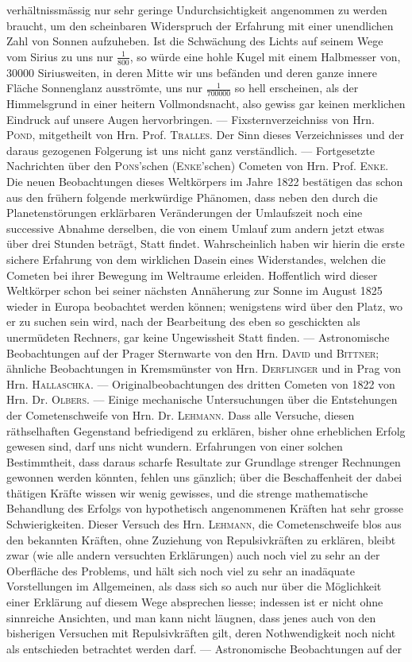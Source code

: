 \noindent verhältnissmässig nur sehr geringe Undurchsichtigkeit angenommen zu werden braucht, um den scheinbaren Widerspruch der Erfahrung mit einer unendlichen Zahl von Sonnen aufzuheben. Ist die Schwächung des Lichts auf seinem Wege vom Sirius zu uns nur $\frac{1}{800}$, so würde eine hohle Kugel mit einem Halbmesser von, 30000 Siriusweiten, in deren Mitte wir uns befänden und deren ganze innere Fläche Sonnenglanz ausströmte, uns nur $\frac{1}{700000}$ so hell erscheinen, als der Himmelsgrund in einer heitern Vollmondsnacht, also gewiss gar keinen merklichen Eindruck auf unsere Augen hervorbringen. --- Fixsternverzeichniss von Hrn. \textsc{Pond}, mitgetheilt von Hrn. Prof. \textsc{Tralles}. Der Sinn dieses Verzeichnisses und der daraus gezogenen Folgerung ist uns nicht ganz verständlich. --- Fortgesetzte Nachrichten über den \textsc{Pons}'schen (\textsc{Enke}'schen) Cometen von Hrn. Prof. \textsc{Enke}. Die neuen Beobachtungen dieses Weltkörpers im Jahre 1822 bestätigen das schon aus den frühern folgende merkwürdige Phänomen, dass neben den durch die Planetenstörungen erklärbaren Veränderungen der Umlaufszeit noch eine successive Abnahme derselben, die von einem Umlauf zum andern jetzt etwas über drei Stunden beträgt, Statt findet. Wahrscheinlich haben wir hierin die erste sichere Erfahrung von dem wirklichen Dasein eines Widerstandes, welchen die Cometen bei ihrer Bewegung im Weltraume erleiden. Hoffentlich wird dieser Weltkörper schon bei seiner nächsten Annäherung zur Sonne im August 1825 wieder in Europa beobachtet werden können; wenigstens wird über den Platz, wo er zu suchen sein wird, nach der Bearbeitung des eben so geschickten als unermüdeten Rechners, gar keine Ungewissheit Statt finden. --- Astronomische Beobachtungen auf der Prager Sternwarte von den Hrn. \textsc{David} und \textsc{Bittner}; ähnliche Beobachtungen in Kremsmünster von Hrn. \textsc{Derflinger} und in Prag von Hrn. \textsc{Hallaschka}. --- Originalbeobachtungen des dritten Cometen von 1822 von Hrn. Dr. \textsc{Olbers}. --- Einige mechanische Untersuchungen über die Entstehungen der Cometenschweife von Hrn. Dr. \textsc{Lehmann}. Dass alle Versuche, diesen räthselhaften Gegenstand befriedigend zu erklären, bisher ohne erheblichen Erfolg gewesen sind, darf uns nicht wundern. Erfahrungen von einer solchen Bestimmtheit, dass daraus scharfe Resultate zur Grundlage strenger Rechnungen gewonnen werden könnten, fehlen uns gänzlich; über die Beschaffenheit der dabei thätigen Kräfte wissen wir wenig gewisses, und die strenge mathematische Behandlung des Erfolgs von hypothetisch angenommenen Kräften hat sehr grosse Schwierigkeiten. Dieser Versuch des Hrn. \textsc{Lehmann}, die Cometenschweife blos aus den bekannten Kräften, ohne Zuziehung von Repulsivkräften zu erklären, bleibt zwar (wie alle andern versuchten Erklärungen) auch noch viel zu sehr an der Oberfläche des Problems, und hält sich noch viel zu sehr an inadäquate Vorstellungen im Allgemeinen, als dass sich so auch nur über die Möglichkeit einer Erklärung auf diesem Wege absprechen liesse; indessen ist er nicht ohne sinnreiche Ansichten, und man kann nicht läugnen, dass jenes auch von den bisherigen Versuchen mit Repulsivkräften gilt, deren Nothwendigkeit noch nicht als entschieden betrachtet werden darf. --- Astronomische Beobachtungen auf der 